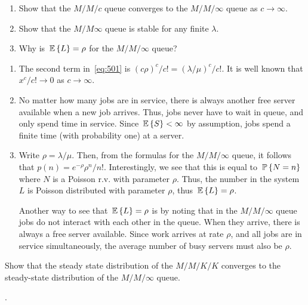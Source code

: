 \begin{question}
  \begin{enumerate}
  \item Show that the $M/M/c$ queue converges to the $M/M/\infty$ queue as $c\to\infty$. 
\item Show that the $M/M\infty$ queue is stable for any finite $\lambda$. 
\item Why is $\E L=\rho$ for the $M/M/\infty$ queue? 
  \end{enumerate}
 \begin{solution}
   \begin{enumerate}
   \item 
   The second term in~\eqref{eq:501} is $(c\rho)^c/c! = (\lambda/\mu)^c/c!$. It is well
   known that $x^c/c!\to 0$ as $c\to \infty$.

 \item    No matter how many jobs are in service, there is always another
   free server available when a new job arrives. Thus, jobs never have
   to wait in queue, and only spend time in service. Since
   $\E S < \infty$ by assumption, jobs spend a finite time (with
   probability one) at a server.
 \item Write $\rho = \lambda /\mu$. Then, from the formulas for the
   $M/M/\infty$ queue, it follows that $p(n) = e^{-\rho} \rho^n/n!$.
   Interestingly, we see that this is equal to $\P{N=n}$ where $N$ is
   a Poisson r.v.  with parameter $\rho$. Thus, the number in the
   system $L$ is Poisson distributed with parameter $\rho$, thus
   $\E L = \rho$.

   Another way to see that $\E L=\rho$ is by noting that in the
   $M/M/\infty$ queue jobs do not interact with each other in the
   queue. When they arrive, there is always a free server
   available. Since work arrives at rate $\rho$, and all jobs are in
   service simultaneously, the average number of busy servers must
   also be $\rho$.
   \end{enumerate}

\end{solution}
\end{question}

\begin{question}[use=false]
  Show that the steady state distribution of the $M/M/K/K$ converges
  to the steady-state distribution of the $M/M/\infty$ queue.
  \begin{solution}
    \TBD.
  \end{solution}
\end{question}

